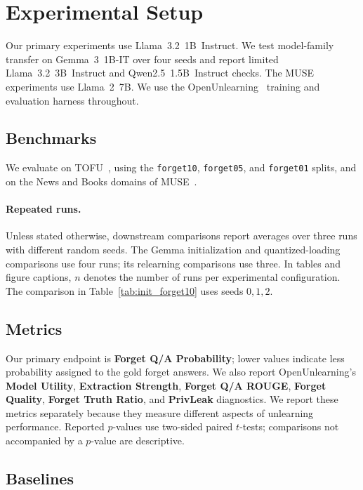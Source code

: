 \documentclass[11pt]{article}
\begin{document}
\section{Experimental Setup}
\label{sec:experiments}

Our primary experiments use Llama~3.2~1B~Instruct. We test model-family transfer on Gemma~3~1B-IT over four seeds and report limited Llama~3.2~3B~Instruct and Qwen2.5~1.5B~Instruct checks. The MUSE experiments use Llama~2~7B. We use the OpenUnlearning~\citep{openunlearning} training and evaluation harness throughout.

\subsection{Benchmarks}

We evaluate on TOFU~\citep{tofu}, using the \texttt{forget10}, \texttt{forget05}, and \texttt{forget01} splits, and on the News and Books domains of MUSE~\citep{muse}.

\paragraph{Repeated runs.}
Unless stated otherwise, downstream comparisons report averages over three runs with different random seeds. The Gemma initialization and quantized-loading comparisons use four runs; its relearning comparisons use three. In tables and figure captions, $n$ denotes the number of runs per experimental configuration.
The comparison in Table~\ref{tab:init_forget10} uses seeds $0,1,2$.

\subsection{Metrics}

Our primary endpoint is \textbf{Forget Q/A Probability}; lower values indicate less probability assigned to the gold forget answers. We also report OpenUnlearning's \textbf{Model Utility}, \textbf{Extraction Strength}, \textbf{Forget Q/A ROUGE}, \textbf{Forget Quality}, \textbf{Forget Truth Ratio}, and \textbf{PrivLeak} diagnostics. We report these metrics separately because they measure different aspects of unlearning performance. Reported $p$-values use two-sided paired $t$-tests; comparisons not accompanied by a $p$-value are descriptive.


\subsection{Baselines}
\label{sec:baselines}
\end{document}
